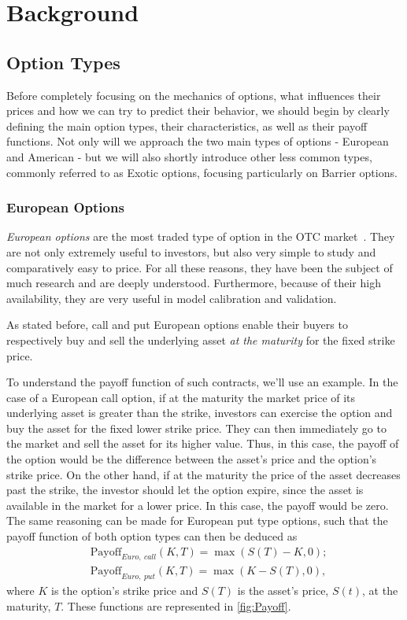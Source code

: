 \chapter{Background}
\label{chapter:background}
\section{Option Types}
Before completely focusing on the mechanics of options, what influences their prices and how we can try to predict their behavior, we should begin by clearly defining the main option types, their characteristics, as well as their payoff functions. Not only will we approach the two main types of options - European and American - but we will also shortly introduce other less common types, commonly referred to as Exotic options, focusing particularly on Barrier options.



\subsection{European Options}
\emph{European options} are the most traded type of option in the OTC market~\citep{InvEuro}. They are not only extremely useful to investors, but also very simple to study and comparatively easy to price. For all these reasons, they have been the subject of much research and are deeply understood. Furthermore, because of their high availability, they are very useful in model calibration and validation.


As stated before, call and put European options enable their buyers to respectively buy and sell the underlying asset \emph{at the maturity} for the fixed strike price.

To understand the payoff function of such contracts, we'll use an example. In the case of a European call option, if at the maturity the market price of its underlying asset is greater than the strike, investors can exercise the option and buy the asset for the fixed lower strike price. They can then immediately go to the market and sell the asset for its higher value. Thus, in this case, the payoff of the option would be the difference between the asset's price and the option's strike price. On the other hand, if at the maturity the price of the asset decreases past the strike, the investor should let the option expire, since the asset is available in the market for a lower price. In this case, the payoff would be zero.
The same reasoning can be made for European put type options, such that the payoff function of both option types can then be deduced as
\begin{equation}\label{callput}
\begin{split}
&\text{Payoff}_{Euro,\ call}(K,T)=\max\left(S(T)-K,0\right);\\
&\text{Payoff}_{Euro,\ put}(K,T)=\max\left(K-S(T),0\right),
\end{split}
\end{equation}
\noindent where $K$ is the option's strike price and $S(T)$ is the asset's price, $S(t)$, at the maturity, $T$. These functions are represented in \autoref{fig:Payoff}.

